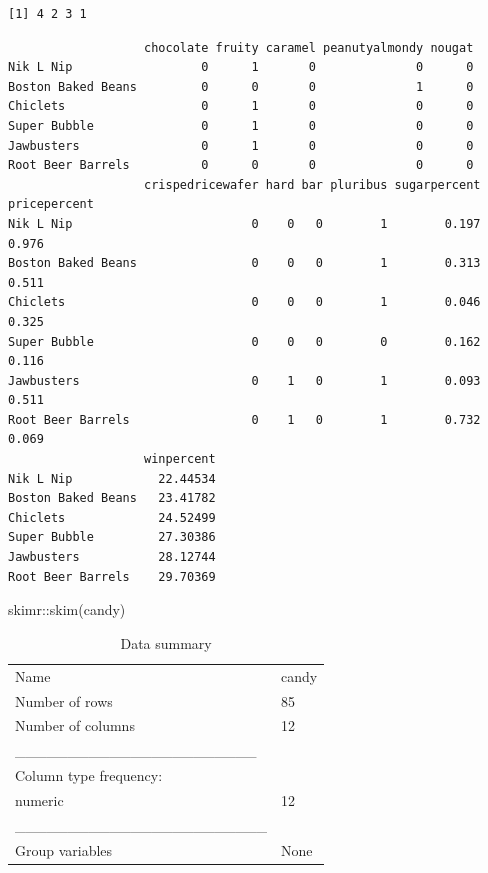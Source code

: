 \documentclass[
  letterpaper,
  DIV=11,
  numbers=noendperiod]{scrartcl}
\newenvironment{Shaded}{\begin{snugshade}}{\end{snugshade}}
\newcommand{\FunctionTok}[1]{\textcolor[rgb]{0.28,0.35,0.67}{#1}}
\newcommand{\NormalTok}[1]{\textcolor[rgb]{0.00,0.23,0.31}{#1}}
\newcommand{\OtherTok}[1]{\textcolor[rgb]{0.00,0.23,0.31}{#1}}
\newcommand{\SpecialCharTok}[1]{\textcolor[rgb]{0.37,0.37,0.37}{#1}}
\begin{document}
\begin{verbatim}
[1] 4 2 3 1
\end{verbatim}

\begin{Shaded}
\end{Shaded}

\begin{verbatim}
                   chocolate fruity caramel peanutyalmondy nougat
Nik L Nip                  0      1       0              0      0
Boston Baked Beans         0      0       0              1      0
Chiclets                   0      1       0              0      0
Super Bubble               0      1       0              0      0
Jawbusters                 0      1       0              0      0
Root Beer Barrels          0      0       0              0      0
                   crispedricewafer hard bar pluribus sugarpercent pricepercent
Nik L Nip                         0    0   0        1        0.197        0.976
Boston Baked Beans                0    0   0        1        0.313        0.511
Chiclets                          0    0   0        1        0.046        0.325
Super Bubble                      0    0   0        0        0.162        0.116
Jawbusters                        0    1   0        1        0.093        0.511
Root Beer Barrels                 0    1   0        1        0.732        0.069
                   winpercent
Nik L Nip            22.44534
Boston Baked Beans   23.41782
Chiclets             24.52499
Super Bubble         27.30386
Jawbusters           28.12744
Root Beer Barrels    29.70369
\end{verbatim}

\begin{Shaded}
\begin{Highlighting}[]
\NormalTok{skimr}\SpecialCharTok{::}\FunctionTok{skim}\NormalTok{(candy)}
\end{Highlighting}
\end{Shaded}

\begin{longtable}[]{@{}ll@{}}
\caption{Data summary}\tabularnewline
\toprule\noalign{}
\endfirsthead
\endhead
\bottomrule\noalign{}
\endlastfoot
Name & candy \\
Number of rows & 85 \\
Number of columns & 12 \\
\_\_\_\_\_\_\_\_\_\_\_\_\_\_\_\_\_\_\_\_\_\_\_ & \\
Column type frequency: & \\
numeric & 12 \\
\_\_\_\_\_\_\_\_\_\_\_\_\_\_\_\_\_\_\_\_\_\_\_\_ & \\
Group variables & None \\
\end{longtable}
\end{document}
